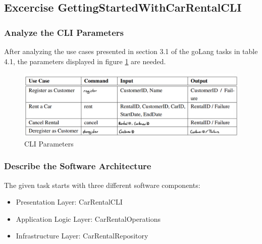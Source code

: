 \subsection{Excercise GettingStartedWithCarRentalCLI}
\label{sec:exercise_getting_started_with_car_rental_cli}
\subsubsection*{Analyze the CLI Parameters}
After analyzing the use cases presented in section 3.1 of the goLang tasks in table 4.1, the parameters displayed in figure \ref{fig:car_rental_cli_parameters} are needed.

\begin{figure}[H]
    \centering
    \includegraphics[width=\textwidth]{figures/goLang/carRental/carRental_CLIParameters.png}
    \caption{CLI Parameters}
    \label{fig:car_rental_cli_parameters}
\end{figure}

\subsubsection*{Describe the Software Architecture}
The given task starts with three different software components:
\begin{itemize}
    \item Presentation Layer: CarRentalCLI
    \item Application Logic Layer: CarRentalOperations
    \item Infrastructure Layer: CarRentalRepository
\end{itemize}
